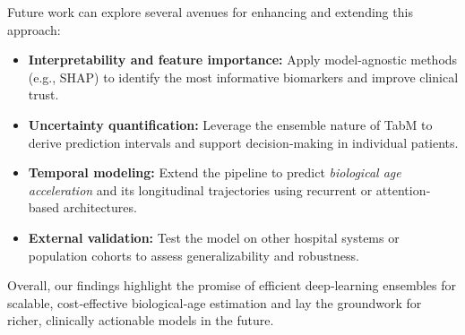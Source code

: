 \documentclass[manuscript,screen,review]{acmart}
\begin{document}
Future work can explore several avenues for enhancing and extending this approach:
\begin{itemize}
  \item \textbf{Interpretability and feature importance:} Apply model‐agnostic methods (e.g., SHAP) to identify the most informative biomarkers and improve clinical trust.
  \item \textbf{Uncertainty quantification:} Leverage the ensemble nature of TabM to derive prediction intervals and support decision‐making in individual patients.
  \item \textbf{Temporal modeling:} Extend the pipeline to predict \emph{biological age acceleration} and its longitudinal trajectories using recurrent or attention‐based architectures.
  \item \textbf{External validation:} Test the model on other hospital systems or population cohorts to assess generalizability and robustness.
\end{itemize}

Overall, our findings highlight the promise of efficient deep‐learning ensembles for scalable, cost‐effective biological‐age estimation and lay the groundwork for richer, clinically actionable models in the future.



\end{document}
